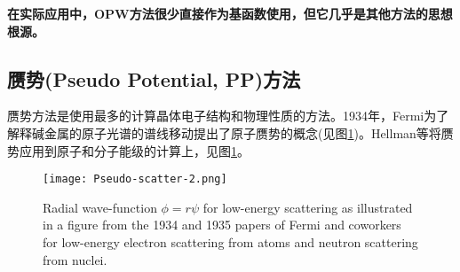 \textbf{在实际应用中，OPW方法很少直接作为基函数使用，但它几乎是其他方法的思想根源。}

\subsection{赝势(Pseudo Potential, PP)方法}
赝势方法是使用最多的计算晶体电子结构和物理性质的方法。1934年，Fermi为了解释碱金属的原子光谱的谱线移动提出了原子赝势的概念(见图\ref{Pseudo-scatter-2})\cite{nc11-157_1934,ajp52-695_1984}。Hellman等将赝势应用到原子和分子能级的计算上\cite{jcp3-61_1935}，见图\ref{Pseudo-scatter-2}。
\begin{figure}[h!]
\centering
\vspace*{-0.25in}
\texttt{[image: Pseudo-scatter-2.png]}
\caption{{\textrm{Radial wave-function $\phi=r\psi$ for low-energy scattering as illustrated in a figure from the 1934 and 1935 papers of Fermi and coworkers for low-energy electron scattering from atoms and neutron scattering from nuclei.}}}%
\label{Pseudo-scatter-2}
\end{figure}

